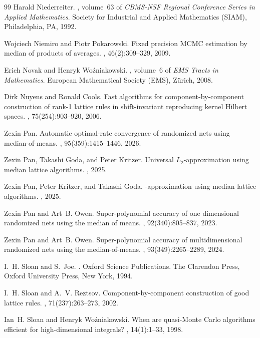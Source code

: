 \documentclass[a4paper,11pt]{article}
\begin{document}
\begin{thebibliography}{99}
Harald Niederreiter.
, volume~63 of {\em CBMS-NSF Regional Conference Series in Applied
  Mathematics}.
\newblock Society for Industrial and Applied Mathematics (SIAM), Philadelphia,
  PA, 1992.

Wojciech Niemiro and Piotr Pokarowski.
\newblock Fixed precision {MCMC} estimation by median of products of averages.
, 46(2):309--329, 2009.

Erich Novak and Henryk Wo\'zniakowski.
, volume~6 of {\em EMS Tracts in Mathematics}.
\newblock European Mathematical Society (EMS), Z\"urich, 2008.

Dirk Nuyens and Ronald Cools.
\newblock Fast algorithms for component-by-component construction of rank-1
  lattice rules in shift-invariant reproducing kernel {H}ilbert spaces.
, 75(254):903--920, 2006.

Zexin Pan.
\newblock Automatic optimal-rate convergence of randomized nets using
  median-of-means.
, 95(359):1415--1446, 2026.

Zexin Pan, Takashi Goda, and Peter Kritzer.
\newblock Universal {$L_2$}-approximation using median lattice algorithms.
, 2025.

Zexin Pan, Peter Kritzer, and Takashi Goda.
-approximation using median lattice algorithms.
, 2025.

Zexin Pan and Art~B. Owen.
\newblock Super-polynomial accuracy of one dimensional randomized nets using
  the median of means.
, 92(340):805--837, 2023.

Zexin Pan and Art~B. Owen.
\newblock Super-polynomial accuracy of multidimensional randomized nets using
  the median-of-means.
, 93(349):2265--2289, 2024.

I.~H. Sloan and S.~Joe.
.
\newblock Oxford Science Publications. The Clarendon Press, Oxford University
  Press, New York, 1994.

I.~H. Sloan and A.~V. Reztsov.
\newblock Component-by-component construction of good lattice rules.
, 71(237):263--273, 2002.

Ian~H. Sloan and Henryk Wo\'zniakowski.
\newblock When are quasi-{M}onte {C}arlo algorithms efficient for
  high-dimensional integrals?
, 14(1):1--33, 1998.

\end{thebibliography}
\end{document}

